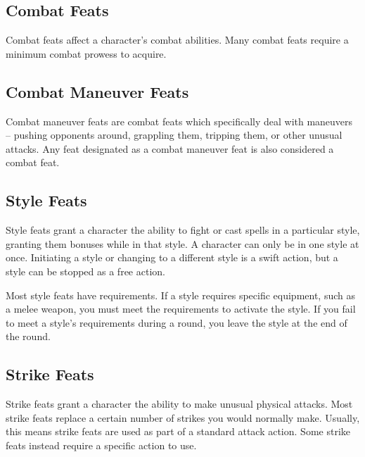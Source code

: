 
\subsection{Combat Feats}
Combat feats affect a character's combat abilities.
Many combat feats require a minimum combat prowess to acquire.

\subsection{Combat Maneuver Feats}
Combat maneuver feats are combat feats which specifically deal with maneuvers -- pushing opponents around, grappling them, tripping them, or other unusual attacks.
Any feat designated as a combat maneuver feat is also considered a combat feat.

\subsection{Style Feats}
Style feats grant a character the ability to fight or cast spells in a particular style, granting them bonuses while in that style.
A character can only be in one style at once.
Initiating a style or changing to a different style is a swift action, but a style can be stopped as a free action.

Most style feats have requirements.
If a style requires specific equipment, such as a melee weapon, you must meet the requirements to activate the style.
If you fail to meet a style's requirements during a round, you leave the style at the end of the round.

\subsection{Strike Feats}\label{Strike Feats}
Strike feats grant a character the ability to make unusual physical attacks.
Most strike feats replace a certain number of strikes you would normally make.
Usually, this means strike feats are used as part of a standard attack action.
Some strike feats instead require a specific action to use.

